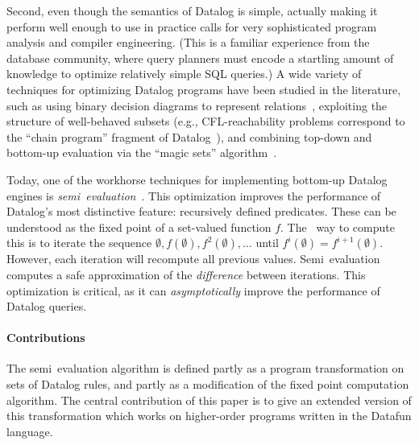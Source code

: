 Second, even though the semantics of Datalog is simple, actually
making it perform well enough to use in practice calls for very
sophisticated program analysis and compiler engineering. (This is a
familiar experience from the database community, where query planners
must encode a startling amount of knowledge to optimize relatively
simple SQL queries.) A wide variety of techniques for optimizing
Datalog programs have been studied in the literature, such as using
binary decision diagrams to represent relations~\cite{whaley-phd},
exploiting the structure of well-behaved subsets (e.g.,
CFL-reachability problems correspond to the ``chain program'' fragment
of Datalog~\cite{chain-programs}), and combining top-down and
bottom-up evaluation via the ``magic sets''
algorithm~\cite{magic-sets}.

Today, one of the workhorse techniques for implementing bottom-up Datalog
engines is \emph{semi\naive\ evaluation}~\cite{seminaive}. This optimization
improves the performance of Datalog's most distinctive feature: recursively
defined predicates. These can be understood as the fixed point of a set-valued
function $f$. The \naive\ way to compute this is to iterate the sequence
$\emptyset, f(\emptyset), f^2(\emptyset), \dots$ until $f^i(\emptyset) =
f^{i+1}(\emptyset)$. However, each iteration will recompute all previous values.
Semi\naive\ evaluation computes a safe approximation of the \emph{difference}
between iterations. This optimization is critical, as it can
\emph{asymptotically} improve the performance of Datalog queries.


\paragraph{Contributions} The semi\naive\ evaluation algorithm is
defined partly as a program transformation on sets of Datalog rules,
and partly as a modification of the fixed point computation algorithm.
The central contribution of this paper is to give an extended version
of this transformation which works on higher-order programs written
in the Datafun language. 

